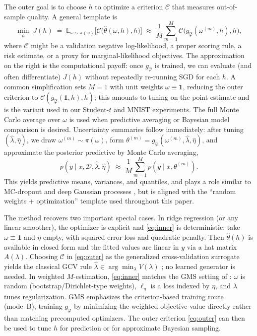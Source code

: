 \documentclass[12pt]{article}
\begin{document}
The outer goal is to choose $h$ to optimize a criterion $\mathcal{C}$ that measures out-of-sample quality. A general template is
\begin{equation}
\label{eq:outer}
\min_{h}\; J(h)
\;=\;
\mathbb{E}_{\omega\sim\pi(\omega)}\Big[\mathcal{C}\big(\hat{\theta}(\omega,h),h\big)\Big]
\;\approx\;
\frac{1}{M}\sum_{m=1}^M \mathcal{C}\big(g_{\hat{\varphi}}(\omega^{(m)},h),h\big),
\end{equation}
where $\mathcal{C}$ might be a validation negative log-likelihood, a proper scoring rule, a risk estimate, or a proxy for marginal-likelihood objectives. The approximation on the right is the computational payoff: once $g_{\hat{\varphi}}$ is trained, we can evaluate (and often differentiate) $J(h)$ without repeatedly re-running SGD for each $h$. A common simplification sets $M=1$ with unit weights $\omega\equiv\mathbf{1}$, reducing the outer criterion to $\mathcal{C}(g_{\hat\varphi}(\mathbf{1},h),h)$; this amounts to tuning on the point estimate and is the variant used in our Student-$t$ and MNIST experiments. The full Monte Carlo average over $\omega$ is used when predictive averaging or Bayesian model comparison is desired. Uncertainty summaries follow immediately: after tuning $(\hat{\lambda},\hat{\eta})$, we draw $\omega^{(m)}\sim\pi(\omega)$, form $\theta^{(m)}=g_{\hat{\varphi}}(\omega^{(m)},\hat{\lambda},\hat{\eta})$, and approximate the posterior predictive by Monte Carlo averaging,
\[
p(y\mid x,\mathcal{D},\hat{\lambda},\hat{\eta}) \;\approx\; \frac{1}{M}\sum_{m=1}^M p(y\mid x,\theta^{(m)}).
\]
This yields predictive means, variances, and quantiles, and plays a role similar to MC-dropout \citep{gal2016dropout} and deep Gaussian processes \citep{schultz2022deep}, but is aligned with the ``random weights + optimization'' template used throughout this paper.

The method recovers two important special cases. In ridge regression (or any linear smoother), the optimizer is explicit and \eqref{eq:inner} is deterministic: take $\omega\equiv \mathbf{1}$ and $\eta$ empty, with squared-error loss and quadratic penalty. Then $\hat{\theta}(h)$ is available in closed form and the fitted values are linear in $y$ via a hat matrix $A(\lambda)$. Choosing $\mathcal{C}$ in \eqref{eq:outer} as the generalized cross-validation surrogate yields the classical GCV rule $\hat{\lambda}\in \arg\min_{\lambda} V(\lambda)$ \citep{golub1979generalized}; no learned generator is needed. In weighted $M$-estimation, \eqref{eq:inner} matches the GMS setting of \citet{shin2023generative,shin2024generative}: $\omega$ is random (bootstrap/Dirichlet-type weights), $\ell_{\eta}$ is a loss indexed by $\eta$, and $\lambda$ tunes regularization. GMS emphasizes the criterion-based training route (mode~B), training $g_{\varphi}$ by minimizing the weighted objective value directly rather than matching precomputed optimizers. The outer criterion \eqref{eq:outer} can then be used to tune $h$ for prediction or for approximate Bayesian sampling.
\end{document}

